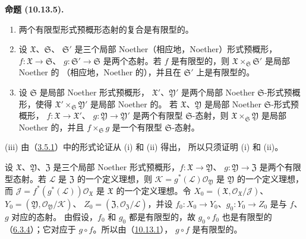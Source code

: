 \documentclass[UTF8,fontset=none,11pt,oneside,openany]{ctexbook}
\newenvironment{proposition}[1][]{%
  \par\medskip\noindent\textbf{命题 (#1).}\ %
}{\par}
\newcommand{\oldpage}[2][]{%
  \hypertarget{ega-source-page-#1-#2}{}%
  \marginnote{\scriptsize\textbf{#1}~|~#2}\ignorespaces}
\let\EGAOriginalLabel\label
\renewcommand{\label}[1]{\phantomsection\EGAOriginalLabel{#1}}
\begin{document}
\begin{proposition}[10.13.5]
\label{I.10.13.5-fr}
\medskip\noindent
\begin{enumerate}
  \item[\rm{(i)}] 两个有限型形式预概形态射的复合是有限型的。

\oldpage[I]{209}

  \item[\rm{(ii)}] 设 $\mathfrak{X}$、$\mathfrak{S}$、
    $\mathfrak{S}'$ 是三个局部 Noether（相应地，Noether）形式预概形，
    $f:\mathfrak{X}\to\mathfrak{S}$、
    $g:\mathfrak{S}'\to\mathfrak{S}$ 是两个态射。若 $f$ 是有限型的，则
    $\mathfrak{X}\times_{\mathfrak{S}}\mathfrak{S}'$ 是局部 Noether 的
    （相应地，Noether 的），并且在 $\mathfrak{S}'$ 上是有限型的。
  \item[\rm{(iii)}] 设 $\mathfrak{S}$ 是局部 Noether 形式预概形，
    $\mathfrak{X}'$、$\mathfrak{Y}'$ 是两个局部 Noether
    $\mathfrak{S}$-形式预概形，使得
    $\mathfrak{X}'\times_{\mathfrak{S}}\mathfrak{Y}'$ 是局部 Noether 的。
    若 $\mathfrak{X}$、$\mathfrak{Y}$ 是局部 Noether
    $\mathfrak{S}$-形式预概形，
    $f:\mathfrak{X}\to\mathfrak{X}'$、
    $g:\mathfrak{Y}\to\mathfrak{Y}'$ 是两个有限型
    $\mathfrak{S}$-态射，则
    $\mathfrak{X}\times_{\mathfrak{S}}\mathfrak{Y}$ 是局部 Noether 的，并且
    $f\times_{\mathfrak{S}}g$ 是一个有限型 $\mathfrak{S}$-态射。
\end{enumerate}
\end{proposition}

(iii) 由（\hyperref[I.3.5.1-fr]{3.5.1}）中的形式论证从 (i) 和 (ii) 得出，
所以只须证明 (i) 和 (ii)。

设 $\mathfrak{X}$、$\mathfrak{Y}$、$\mathfrak{Z}$ 是三个局部 Noether
形式预概形，$f:\mathfrak{X}\to\mathfrak{Y}$、
$g:\mathfrak{Y}\to\mathfrak{Z}$ 是两个有限型态射。若
$\mathscr{L}$ 是 $\mathfrak{Z}$ 的一个定义理想，则
$\mathscr{K}=g^*(\mathscr{L})\mathscr{O}_{\mathfrak{Y}}$ 是
$\mathfrak{Y}$ 的一个定义理想，而
$\mathscr{J}=f^*(g^*(\mathscr{L}))\mathscr{O}_{\mathfrak{X}}$ 是
$\mathfrak{X}$ 的一个定义理想。令
$X_0=(\mathfrak{X},\mathscr{O}_{\mathfrak{X}}/\mathscr{J})$、
$Y_0=(\mathfrak{Y},\mathscr{O}_{\mathfrak{Y}}/\mathscr{K})$、
$Z_0=(\mathfrak{Z},\mathscr{O}_{\mathfrak{Z}}/\mathscr{L})$，并设
$f_0:X_0\to Y_0$、$g_0:Y_0\to Z_0$ 是与 $f$、$g$ 对应的态射。
由假设，$f_0$ 和 $g_0$ 都是有限型的，故
$g_0\circ f_0$ 也是有限型的（\hyperref[I.6.3.4-fr]{6.3.4}）；它对应于
$g\circ f$。所以由（\hyperref[I.10.13.1-fr]{10.13.1}），
$g\circ f$ 是有限型的。
\end{document}

